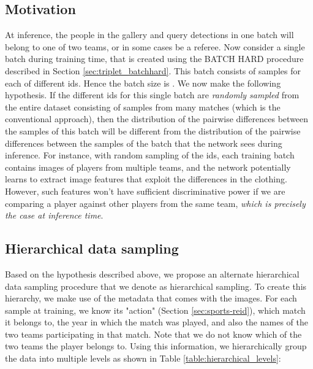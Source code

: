 \documentclass{article}
\begin{document}
\subsection{Motivation}










At inference, the people in the gallery and query detections in one batch will belong to one of two teams, or in some cases be a referee. Now consider a single batch during training time, that is created using the BATCH HARD procedure \cite{hermans2017defense} described in Section \ref{sec:triplet_batchhard}. This batch consists of  samples for each of  different ids. Hence the batch size is . We now make the following hypothesis. If the  different ids for this single batch are \emph{randomly sampled} from the entire dataset consisting of samples from many matches (which is the conventional approach), then the distribution of the pairwise differences between the samples of this batch will be different from the distribution of the pairwise differences between the samples of the batch that the network sees during inference. For instance, with random sampling of the ids, each training batch contains images of players from multiple teams, and the network potentially learns to extract image features that exploit the differences in the clothing. However, such features won't have sufficient discriminative power if we are comparing a player against other players from the same team, \emph{which is precisely the case at inference time}.



\subsection{Hierarchical data sampling}
Based on the hypothesis described above, we propose an alternate hierarchical data sampling procedure that we denote as hierarchical sampling. To create this hierarchy, we make use of the metadata that comes with the images. For each sample at training, we know its "action" (Section \ref{sec:sports-reid}), which match it belongs to, the year in which the match was played, and also the names of the two teams participating in that match. Note that we do not know which of the two teams the player belongs to. Using this information, we hierarchically group the data into multiple levels as shown in Table \ref{table:hierarchical_levels}: 
\end{document}
